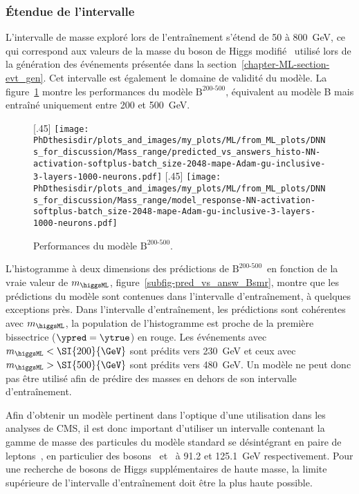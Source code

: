 \subsubsection{Étendue de l'intervalle}
\def\Bsmr{$\text{B}^\text{200-500}$}
L'intervalle de masse exploré lors de l'entraînement s'étend de \num{50} à \SI{800}{\GeV},
ce qui correspond aux valeurs de la masse du boson de Higgs modifié \higgsML\ utilisé lors de la génération des événements
présentée dans la section~\ref{chapter-ML-section-evt_gen}.
Cet intervalle est également le domaine de validité du modèle.
La figure~\ref{fig-Bsmr}
montre les performances du modèle \Bsmr,
équivalent au modèle B mais entraîné uniquement entre \num{200} et \SI{500}{\GeV}.
\begin{figure}[h]
\centering

[.45\textwidth]
{\texttt{[image: \\PhDthesisdir/plots\_and\_images/my\_plots/ML/from\_ML\_plots/DNNs\_for\_discussion/Mass\_range/predicted\_vs\_answers\_histo-NN-activation-softplus-batch\_size-2048-mape-Adam-gu-inclusive-3-layers-1000-neurons.pdf]}\vspace{-.5\baselineskip}}
\hfill
{}[.45\textwidth]
{\texttt{[image: \\PhDthesisdir/plots\_and\_images/my\_plots/ML/from\_ML\_plots/DNNs\_for\_discussion/Mass\_range/model\_response-NN-activation-softplus-batch\_size-2048-mape-Adam-gu-inclusive-3-layers-1000-neurons.pdf]}\vspace{-.5\baselineskip}}

\caption{Performances du modèle \Bsmr.}
\label{fig-Bsmr}
\end{figure}
\par
L'histogramme à deux dimensions des prédictions de \Bsmr\ en fonction de la vraie valeur de $m_{\higgsML}$,
figure~\ref{subfig-pred_vs_answ_Bsmr},
montre que les prédictions du modèle sont contenues dans l'intervalle d'entraînement,
à quelques exceptions près.
Dans l'intervalle d'entraînement, les prédictions sont cohérentes avec $m_{\higgsML}$,
la population de l'histogramme est proche de la première bissectrice ($\ypred=\ytrue$) en rouge.
Les événements
avec $m_{\higgsML}<\SI{200}{\GeV}$ sont prédits vers \SI{230}{\GeV}
et ceux 
avec $m_{\higgsML}>\SI{500}{\GeV}$ sont prédits vers \SI{480}{\GeV}.
Un modèle ne peut donc pas être utilisé afin de prédire des masses en dehors de son intervalle d'entraînement.
\par
Afin d'obtenir un modèle pertinent dans l'optique d'une utilisation dans les analyses de CMS,
il est donc important d'utiliser un intervalle
contenant la gamme de masse des particules du modèle standard se désintégrant en paire de leptons~\tau,
en particulier des bosons \Zboson\ et \higgs\ à \num{91.2} et \SI{125.1}{\GeV} respectivement.
Pour une recherche de bosons de Higgs supplémentaires de haute masse,
la limite supérieure de l'intervalle d'entraînement doit être la plus haute possible.
